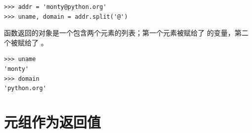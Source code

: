  

\begin{lstlisting}
>>> addr = 'monty@python.org'
>>> uname, domain = addr.split('@')
\end{lstlisting}

%

 函数返回的对象是一个包含两个元素的列表；第一个元素被赋给了 的变量，第二个被赋给了 。

\begin{lstlisting}
>>> uname
'monty'
>>> domain
'python.org'
\end{lstlisting}
%

\section{元组作为返回值}
  


